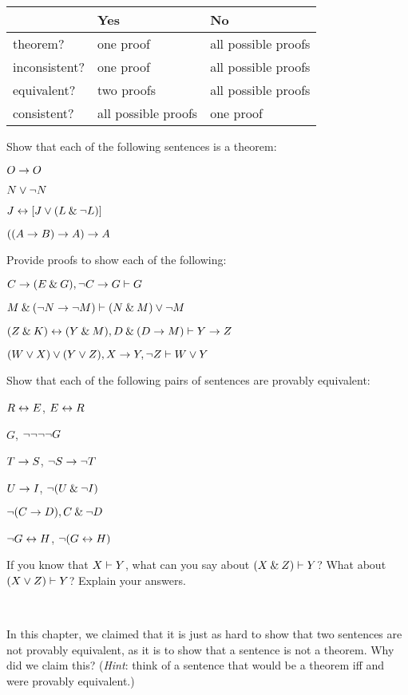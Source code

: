 \begin{center}
\begin{tabular}{l l l}
 & \textbf{Yes} & \textbf{No}\\
 \hline
theorem? & one proof & all possible proofs\\
inconsistent? &  one proof  & all possible proofs\\
equivalent? & two proofs & all possible proofs\\
consistent? & all possible proofs & one proof\\
\end{tabular}
\end{center}


\practiceproblems
\problempart
Show that each of the following sentences is a theorem:
\begin{earg}
\item $O \rightarrow O$
\item $N \vee \neg N$
\item $J \leftrightarrow [J\vee (L\mathbin{\&}\neg L)]$
\item $((A \rightarrow B) \rightarrow A) \rightarrow A$ 
\end{earg}

\problempart
Provide proofs to show each of the following:
\begin{earg}
\item $C\rightarrow(E\mathbin{\&} G), \neg C \rightarrow G \vdash G$
\item $M \mathbin{\&} (\neg N \rightarrow \neg M) \vdash (N \mathbin{\&} M) \vee \neg M$
\item $(Z\mathbin{\&} K)\leftrightarrow(Y\mathbin{\&} M), D\mathbin{\&}(D\rightarrow M) \vdash Y\rightarrow Z$
\item $(W \vee X) \vee (Y \vee Z), X\rightarrow Y, \neg Z \vdash W\vee Y$
\end{earg}

\problempart
Show that each of the following pairs of sentences are provably equivalent:
\begin{earg}
\item $R \leftrightarrow E$, $E \leftrightarrow R$
\item $G$, $\neg\neg\neg\neg G$
\item $T\rightarrow S$, $\neg S \rightarrow \neg T$
\item $U \rightarrow I$, $\neg(U \mathbin{\&} \neg I)$
\item $\neg (C \rightarrow D), C \mathbin{\&} \neg D$
\item $\neg G \leftrightarrow H$, $\neg(G \leftrightarrow H)$ 
\end{earg}

\problempart
If you know that $X\vdash Y$, what can you say about $(X\mathbin{\&}Z)\vdash Y$? What about $(X\vee Z)\vdash Y$? Explain your answers.

\

\problempart In this chapter, we claimed that it is just as hard to show that two sentences are not provably equivalent, as it is to show that a sentence is not a theorem. Why did we claim this? (\emph{Hint}: think of a sentence that would be a theorem iff \metaX and \metaY were provably equivalent.)





